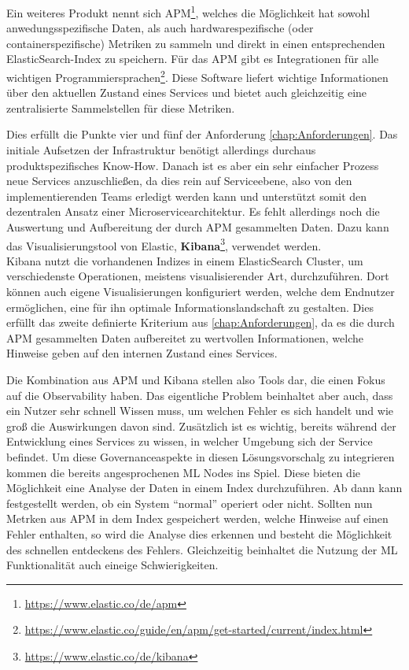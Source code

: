 \documentclass[
	12pt,
	BCOR=5mm,
	DIV=12,
	headinclude=on,
	footinclude=off,
	parskip=half,
	bibliography=totoc,
	listof=entryprefix,
	toc=listof,
	numbers=noenddot,
	plainfootsepline
]{scrreprt}
\begin{document}
Ein weiteres Produkt nennt sich \ac{APM}\footnote{\url{https://www.elastic.co/de/apm}}, welches die Möglichkeit hat sowohl anwedungsspezifische Daten, als auch hardwarespezifische (oder containerspezifische) Metriken zu sammeln und direkt in einen entsprechenden ElasticSearch-Index zu speichern. Für das \ac{APM} gibt es Integrationen für alle wichtigen Programmiersprachen\footnote{\url{https://www.elastic.co/guide/en/apm/get-started/current/index.html}}. Diese Software liefert wichtige Informationen über den aktuellen Zustand eines Services und bietet auch gleichzeitig eine zentralisierte Sammelstellen für diese Metriken. 

Dies erfüllt die Punkte vier und fünf der Anforderung \vref{chap:Anforderungen}. Das initiale Aufsetzen der Infrastruktur benötigt allerdings durchaus produktspezifisches Know-How. Danach ist es aber ein sehr einfacher Prozess neue Services anzuschließen, da dies rein auf Serviceebene, also von den implementierenden Teams erledigt werden kann und unterstützt somit den dezentralen Ansatz einer Microservicearchitektur. Es fehlt allerdings noch die Auswertung und Aufbereitung der durch \ac{APM} gesammelten Daten. Dazu kann das Visualisierungstool von Elastic, \textbf{Kibana}\footnote{\url{https://www.elastic.co/de/kibana}}, verwendet werden. \\
Kibana nutzt die vorhandenen Indizes in einem ElasticSearch Cluster, um verschiedenste Operationen, meistens visualisierender Art, durchzuführen. Dort können auch eigene Visualisierungen konfiguriert werden, welche dem Endnutzer ermöglichen, eine für ihn optimale Informationslandschaft zu gestalten. Dies erfüllt das zweite definierte Kriterium aus \vref{chap:Anforderungen}, da es die durch \ac{APM} gesammelten Daten aufbereitet zu wertvollen Informationen, welche Hinweise geben auf den internen Zustand eines Services.

Die Kombination aus \ac{APM} und Kibana stellen also Tools dar, die einen Fokus auf die Observability haben. Das eigentliche Problem beinhaltet aber auch, dass ein Nutzer sehr schnell Wissen muss, um welchen Fehler es sich handelt und wie groß die Auswirkungen davon sind. Zusätzlich ist es wichtig, bereits während der Entwicklung eines Services zu wissen, in welcher Umgebung sich der Service befindet. Um diese Governanceaspekte in diesen Lösungsvorschalg zu integrieren kommen die bereits angesprochenen \ac{ML} Nodes ins Spiel. Diese bieten die Möglichkeit eine Analyse der Daten in einem Index durchzuführen. Ab dann kann festgestellt werden, ob ein System \enquote{normal} operiert oder nicht. Sollten nun Metrken aus \ac{APM} in dem Index gespeichert werden, welche Hinweise auf einen Fehler enthalten, so wird die Analyse dies erkennen und besteht die Möglichkeit des schnellen entdeckens des Fehlers. Gleichzeitig beinhaltet die Nutzung der \ac{ML} Funktionalität auch eineige Schwierigkeiten.
\end{document}

